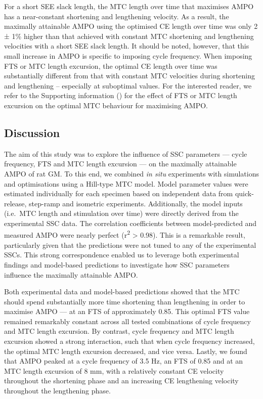\documentclass[
  10pt,
  letterpaper,
]{article}
\begin{document}
For a short SEE slack length, the MTC length over time that maximises
AMPO has a near-constant shortening and lengthening velocity. As a
result, the maximally attainable AMPO using the optimised CE length over
time was only 2 ± 1\% higher than that achieved with constant MTC
shortening and lengthening velocities with a short SEE slack length. It
should be noted, however, that this small increase in AMPO is specific
to imposing cycle frequency. When imposing FTS or MTC length excursion,
the optimal CE length over time was substantially different from that
with constant MTC velocities during shortening and lengthening --
especially at suboptimal values. For the interested reader, we refer to
the Supporting information ({}) for the effect of FTS
or MTC length excursion on the optimal MTC behaviour for maximising
AMPO.

\subsection{Discussion}\label{discussion}

The aim of this study was to explore the influence of SSC parameters ---
cycle frequency, FTS and MTC length excursion --- on the maximally
attainable AMPO of rat GM. To this end, we combined \emph{in situ}
experiments with simulations and optimisations using a Hill-type MTC
model. Model parameter values were estimated individually for each
specimen based on independent data from quick-release, step-ramp and
isometric experiments. Additionally, the model inputs (i.e.~MTC length
and stimulation over time) were directly derived from the experimental
SSC data. The correlation coefficients between model-predicted and
measured AMPO were nearly perfect (r\textsuperscript{2} \textgreater{}
0.98). This is a remarkable result, particularly given that the
predictions were not tuned to any of the experimental SSCs. This strong
correspondence enabled us to leverage both experimental findings and
model-based predictions to investigate how SSC parameters influence the
maximally attainable AMPO.

Both experimental data and model-based predictions showed that the MTC
should spend substantially more time shortening than lengthening in
order to maximise AMPO --- at an FTS of approximately 0.85. This optimal
FTS value remained remarkably constant across all tested combinations of
cycle frequency and MTC length excursion. By contrast, cycle frequency
and MTC length excursion showed a strong interaction, such that when
cycle frequency increased, the optimal MTC length excursion decreased,
and vice versa. Lastly, we found that AMPO peaked at a cycle frequency
of 3.5 Hz, an FTS of 0.85 and at an MTC length excursion of 8 mm, with a
relatively constant CE velocity throughout the shortening phase and an
increasing CE lengthening velocity throughout the lengthening phase.
\end{document}
